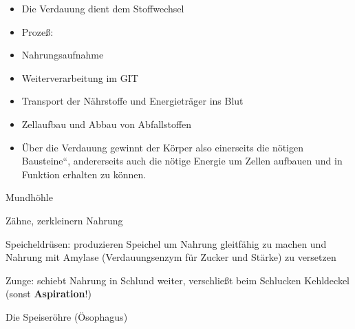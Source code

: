 \documentclass{article}
\newcommand\gEs[1]{\textbf{\textcolor[rgb]{0.0,0.0,0.5019608}{#1}}}
\newcommand\gEs[1]{\textbf{\textcolor[rgb]{0.0,0.0,0.5019608}{#1}}}
\begin{document}
\begin{itemize}
\item {\mdseries
Die Verdauung dient dem Stoffwechsel}

\item {\mdseries
Proze{\ss}:}

\end{itemize}
\begin{itemize}
\item {\mdseries
Nahrungsaufnahme}

\item {\mdseries
Weiterverarbeitung im GIT}

\item {\mdseries
Transport der N\"ahrstoffe und Energietr\"ager  ins Blut}

\item {\mdseries
Zellaufbau und Abbau von Abfallstoffen}

\end{itemize}
\begin{itemize}
\item {\mdseries
\"Uber die Verdauung gewinnt der K\"orper  also einerseits die n\"otigen
{\quotedblbase}Bausteine{\textquotedblleft},  andererseits auch die
n\"otige Energie um  Zellen aufbauen und in Funktion erhalten  zu
k\"onnen.}

\end{itemize}
{\mdseries\color[rgb]{0.0,0.0,0.5019608}
Mundh\"ohle}

{\mdseries
Z\"ahne, zerkleinern Nahrung}

{\mdseries
Speicheldr\"usen: produzieren Speichel um Nahrung gleitf\"ahig zu machen
und Nahrung mit Amylase (Verdauungsenzym f\"ur Zucker und St\"arke) zu
versetzen}

{\mdseries
Zunge: schiebt Nahrung in Schlund weiter, verschlie{\ss}t beim Schlucken
Kehldeckel (sonst  \gEs{Aspiration}!)}

{\mdseries\color[rgb]{0.0,0.0,0.5019608}
Die Speiser\"ohre (\"Osophagus)}
\end{document}

